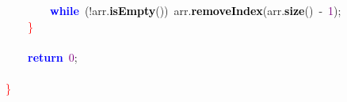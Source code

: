 \mbox{}\ \ \ \ \ \ \ \ \textbf{\textcolor{Blue}{while}}\ \textcolor{BrickRed}{(!}arr\textcolor{BrickRed}{.}\textbf{\textcolor{Black}{isEmpty}}\textcolor{BrickRed}{())}\ arr\textcolor{BrickRed}{.}\textbf{\textcolor{Black}{removeIndex}}\textcolor{BrickRed}{(}arr\textcolor{BrickRed}{.}\textbf{\textcolor{Black}{size}}\textcolor{BrickRed}{()}\ \textcolor{BrickRed}{-}\ \textcolor{Purple}{1}\textcolor{BrickRed}{);} \\
\mbox{}\ \ \ \ \textcolor{Red}{\}} \\
\mbox{} \\
\mbox{}\ \ \ \ \textbf{\textcolor{Blue}{return}}\ \textcolor{Purple}{0}\textcolor{BrickRed}{;} \\
\mbox{} \\
\mbox{}\textcolor{Red}{\}} \\
\mbox{} \\
